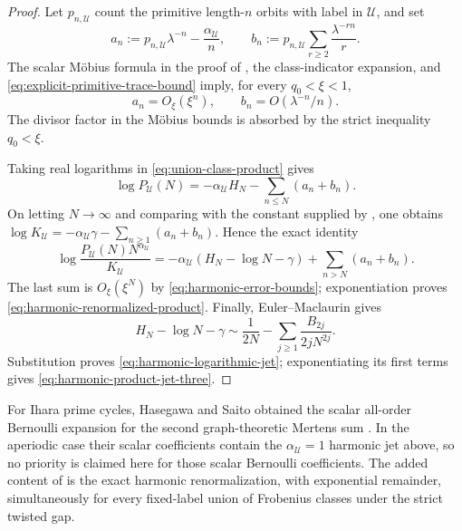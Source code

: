 \begin{proof}
Let \(p_{n,\mathscr U}\) count the primitive length-\(n\) orbits with label
in \(\mathscr U\), and set
\begin{equation}\label{eq:harmonic-error-sequences}
 a_n:=p_{n,\mathscr U}\lambda^{-n}
      -\frac{\alpha_{\mathscr U}}{n},
 \qquad
 b_n:=p_{n,\mathscr U}\sum_{r\ge2}\frac{\lambda^{-rn}}{r}.
\end{equation}
The scalar M\"obius formula in the proof of , the
class-indicator expansion, and
\eqref{eq:explicit-primitive-trace-bound} imply, for every \(q_0<\xi<1\),
\begin{equation}\label{eq:harmonic-error-bounds}
 a_n=O_\xi(\xi^n),\qquad b_n=O(\lambda^{-n}/n).
\end{equation}
The divisor factor in the M\"obius bounds is absorbed by the strict
inequality \(q_0<\xi\).

Taking real logarithms in \eqref{eq:union-class-product} gives
\[
 \log P_{\mathscr U}(N)
 =-\alpha_{\mathscr U}H_N-
   \sum_{n\le N}(a_n+b_n).
\]
On letting \(N\to\infty\) and comparing with the constant supplied by
, one obtains
\(\log K_{\mathscr U}=-\alpha_{\mathscr U}\gamma-
\sum_{n\ge1}(a_n+b_n)\).  Hence the exact identity
\begin{equation}\label{eq:exact-harmonic-remainder}
 \log\frac{P_{\mathscr U}(N)N^{\alpha_{\mathscr U}}}{K_{\mathscr U}}
 =-\alpha_{\mathscr U}(H_N-\log N-\gamma)
  +\sum_{n>N}(a_n+b_n).
\end{equation}
The last sum is \(O_\xi(\xi^N)\) by
\eqref{eq:harmonic-error-bounds}; exponentiation proves
\eqref{eq:harmonic-renormalized-product}.  Finally, Euler--Maclaurin gives
\[
 H_N-\log N-\gamma
 \sim \frac{1}{2N}-\sum_{j\ge1}\frac{B_{2j}}{2jN^{2j}}.
\]
Substitution proves \eqref{eq:harmonic-logarithmic-jet}; exponentiating its
first terms gives \eqref{eq:harmonic-product-jet-three}.
\end{proof}

For Ihara prime cycles, Hasegawa and Saito obtained the scalar all-order
Bernoulli expansion for the second graph-theoretic Mertens sum
\cite{HasegawaSaito2016GraphMertens}.  In the aperiodic case their scalar
coefficients contain the \(\alpha_{\mathscr U}=1\) harmonic jet above, so no
priority is claimed here for those scalar Bernoulli coefficients.  The added
content of  is the exact harmonic
renormalization, with exponential remainder, simultaneously for every
fixed-label union of Frobenius classes under the strict twisted gap.
